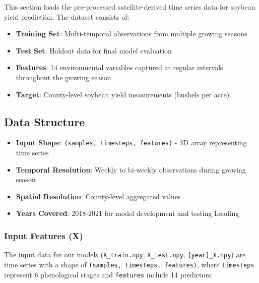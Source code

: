 \documentclass[
  letterpaper,
  DIV=11,
  numbers=noendperiod]{scrreprt}
\providecommand{\tightlist}{%
  \setlength{\itemsep}{0pt}\setlength{\parskip}{0pt}}\usepackage{longtable,booktabs,array}
\begin{document}
This section loads the pre-processed satellite-derived time series data
for soybean yield prediction. The dataset consists of:

\begin{itemize}
\tightlist
\item
  \textbf{Training Set}: Multi-temporal observations from multiple
  growing seasons
\item
  \textbf{Test Set}: Holdout data for final model evaluation
\item
  \textbf{Features}: 14 environmental variables captured at regular
  intervals throughout the growing season
\item
  \textbf{Target}: County-level soybean yield measurements (bushels per
  acre)
\end{itemize}

\subsection{Data Structure}\label{data-structure}

\begin{itemize}
\tightlist
\item
  \textbf{Input Shape}: \texttt{(samples,\ timesteps,\ features)} - 3D
  array representing time series
\item
  \textbf{Temporal Resolution}: Weekly to bi-weekly observations during
  growing season
\item
  \textbf{Spatial Resolution}: County-level aggregated values
\item
  \textbf{Years Covered}: 2018-2021 for model development and testing
  Loading
\end{itemize}

\subsubsection{Input Features (X)}\label{input-features-x}

The input data for our models (\texttt{X\_train.npy},
\texttt{X\_test.npy}, \texttt{{[}year{]}\_X.npy}) are time series with a
shape of \texttt{(samples,\ timesteps,\ features)}, where
\texttt{timesteps} represent 6 phenological stages and \texttt{features}
include 14 predictors:
\end{document}
